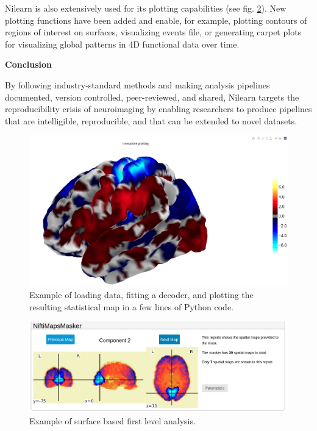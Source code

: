 \documentclass[a4paper]{article}
\begin{document}
\medskip

\noindent Nilearn is also extensively used for its plotting capabilities (see fig. \ref{fig:figure_2}). New plotting functions have been added and enable, for example, plotting contours of regions of interest on surfaces, visualizing events file, or generating carpet plots for visualizing global patterns in 4D functional data over time.

\bigskip

\noindent \textbf{Conclusion}

\medskip

\noindent By following industry-standard methods and making analysis pipelines documented, version controlled, peer-reviewed, and shared, Nilearn targets the reproducibility crisis of neuroimaging by enabling researchers to produce pipelines that are intelligible, reproducible, and that can be extended to novel datasets.

\newpage


\begin{figure}[htp]
	\centering
	\includegraphics[scale=.8]{./figure_1}
	\caption{Example of loading data, fitting a decoder, and plotting the resulting statistical map in a few lines of Python code.}
	\label{fig:figure_1}
\end{figure}

\begin{figure}[hbp]
	\centering
	\includegraphics[scale=.8]{./figure_2}
	\caption{Example of surface based first level analysis.}
	\label{fig:figure_2}
\end{figure}

\newpage

 

\end{document}
